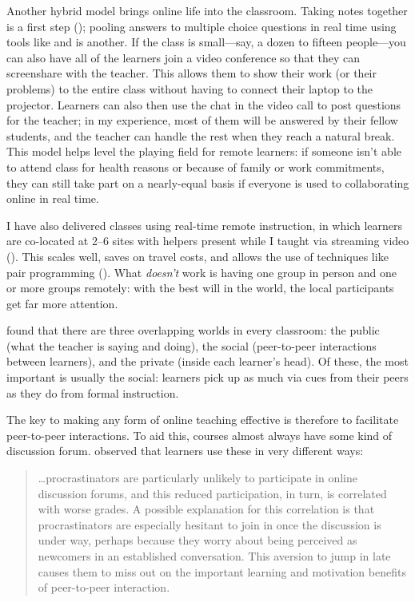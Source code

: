 Another hybrid model brings online life into the classroom.
Taking notes together is a first step ();
pooling answers to multiple choice questions in real time
using tools like 
and  is another.
If the class is small---say, a dozen to fifteen people---you can also
have all of the learners join a video conference
so that they can screenshare with the teacher.
This allows them to show their work (or their problems) to the entire class
without having to connect their laptop to the projector.
Learners can also then use the chat in the video call to post questions for the teacher;
in my experience,
most of them will be answered by their fellow students,
and the teacher can handle the rest when they reach a natural break.
This model helps level the playing field for remote learners:
if someone isn't able to attend class for health reasons
or because of family or work commitments,
they can still take part on a nearly-equal basis
if everyone is used to collaborating online in real time.

I have also delivered classes using real-time remote instruction,
in which learners are co-located at 2--6 sites with helpers present
while I taught via streaming video ().
This scales well,
saves on travel costs,
and allows the use of techniques like pair programming ().
What \emph{doesn't} work is having one group in person and one or more groups remotely:
with the best will in the world,
the local participants get far more attention.


\cite{Nuth2007} found that there are three overlapping worlds in every classroom:
the public (what the teacher is saying and doing),
the social (peer-to-peer interactions between learners),
and the private (inside each learner's head).
Of these,
the most important is usually the social:
learners pick up as much via cues from their peers as they do from formal instruction.

The key to making any form of online teaching effective is therefore
to facilitate peer-to-peer interactions.
To aid this,
courses almost always have some kind of discussion forum.
\cite{Mill2016a} observed that learners use these in very different ways:

\begin{quote}

  {\ldots}procrastinators are particularly unlikely to participate in online discussion forums,
  and this reduced participation,
  in turn,
  is correlated with worse grades.
  A possible explanation for this correlation is that
  procrastinators are especially hesitant to join in once the discussion is under way,
  perhaps because they worry about being perceived as newcomers in an established conversation.
  This aversion to jump in late
  causes them to miss out on the important learning and motivation benefits of peer-to-peer interaction.

\end{quote}

